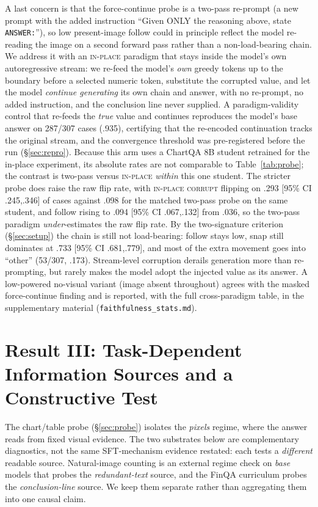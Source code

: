 \documentclass[11pt]{article}
\newcommand{\corrupt}{\textsc{corrupt}}
\newcommand{\inplace}{\textsc{in-place}}
\begin{document}
A last concern is that the force-continue probe is a two-pass re-prompt (a new prompt with the added instruction ``Given ONLY the reasoning above, state \texttt{ANSWER:}''), so low present-image follow could in principle reflect the model re-reading the image on a second forward pass rather than a non-load-bearing chain. We address it with an \inplace{} paradigm that stays inside the model's own autoregressive stream: we re-feed the model's \emph{own} greedy tokens up to the boundary before a selected numeric token, substitute the corrupted value, and let the model \emph{continue generating} its own chain and answer, with no re-prompt, no added instruction, and the conclusion line never supplied. A paradigm-validity control that re-feeds the \emph{true} value and continues reproduces the model's base answer on 287/307 cases (.935), certifying that the re-encoded continuation tracks the original stream, and the convergence threshold was pre-registered before the run (\S\ref{sec:repro}). Because this arm uses a ChartQA 8B student retrained for the in-place experiment, its absolute rates are not comparable to Table~\ref{tab:probe}; the contrast is two-pass versus \inplace{} \emph{within} this one student. The stricter probe does raise the raw flip rate, with \inplace{} \corrupt{} flipping on .293 [95\% CI .245,.346] of cases against .098 for the matched two-pass probe on the same student, and follow rising to .094 [95\% CI .067,.132] from .036, so the two-pass paradigm \emph{under}-estimates the raw flip rate. By the two-signature criterion (\S\ref{sec:setup}) the chain is still not load-bearing: follow stays low, snap still dominates at .733 [95\% CI .681,.779], and most of the extra movement goes into ``other'' (53/307, .173). Stream-level corruption derails generation more than re-prompting, but rarely makes the model adopt the injected value as its answer. A low-powered no-visual variant (image absent throughout) agrees with the masked force-continue finding and is reported, with the full cross-paradigm table, in the supplementary material (\texttt{faithfulness\_stats.md}).

\section{Result III: Task-Dependent Information Sources and a Constructive Test}
\label{sec:regime}

The chart/table probe (\S\ref{sec:probe}) isolates the \emph{pixels} regime, where the answer reads from fixed visual evidence. The two substrates below are complementary diagnostics, not the same SFT-mechanism evidence restated: each tests a \emph{different} readable source. Natural-image counting is an external regime check on \emph{base} models that probes the \emph{redundant-text} source, and the FinQA curriculum probes the \emph{conclusion-line} source. We keep them separate rather than aggregating them into one causal claim.
\end{document}

